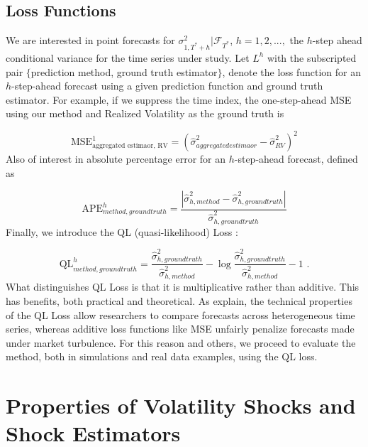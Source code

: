 \documentclass[11pt,3p,review,authoryear]{elsarticle}
\theoremstyle{definition}
\begin{document}
\subsection{Loss Functions}\label{loss_function}

We are interested in point forecasts for $\sigma^{2}_{1,T^{*}+h}|\mathcal{F}_{T^{*}}$, $h=1,2,...,$ the $h$-step ahead conditional variance for the time series under study.  Let $L^{h}$ with the subscripted pair $\{$prediction method, ground truth estimator$\}$, denote the loss function for an $h$-step-ahead forecast using a given prediction function and ground truth estimator.  For example, if we suppress the time index, the one-step-ahead MSE using our method and Realized Volatility as the ground truth is

$$ \text{MSE}^{1}_{\text{aggregated estimaor, RV}} = (\hat\sigma^{2}_{aggregated estimaor} - \hat\sigma^{2}_{RV})^{2}$$
Also of interest in absolute percentage error for an $h$-step-ahead forecast, defined as

\[ 
\text{APE}^{h}_{method, ground truth} = \frac{|\hat\sigma^{2}_{h, method} - \hat\sigma^{2}_{h, ground truth}|}{\hat\sigma^{2}_{h, ground truth}}
\]
Finally, we introduce the QL (quasi-likelihood) Loss \citep{brownlees2011practical}:

\[ 
\text{QL}^{h}_{method, ground truth} = \frac{\hat\sigma^{2}_{h, ground truth}}{ \hat\sigma^{2}_{h, method}} - \log{\frac{\hat\sigma^{2}_{h, ground truth}}{ \hat\sigma^{2}_{h, method}}} -1 \text{ .}
\]
What distinguishes QL Loss is that it is multiplicative rather than additive.  This has benefits, both practical and theoretical.  As \citet{brownlees2011practical} explain, the technical properties of the QL Loss allow researchers to compare forecasts across heterogeneous time series, whereas additive loss functions like MSE unfairly penalize forecasts made under market turbulence.  For this reason and others, we proceed to evaluate the method, both in simulations and real data examples, using the QL loss.



\section{Properties of Volatility Shocks and Shock Estimators}\label{SVF_properties}
\end{document}
